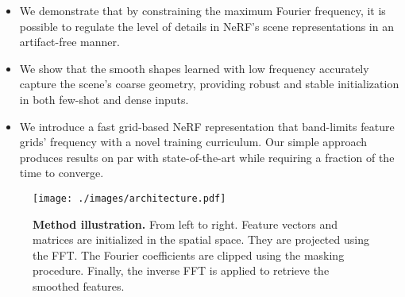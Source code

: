 \begin{itemize}
\item We demonstrate that by constraining the maximum Fourier frequency, it is possible to regulate the level of details in NeRF's scene representations in an artifact-free manner.
\item We show that the smooth shapes learned with low frequency accurately capture the scene's coarse geometry, providing robust and stable initialization in both few-shot and dense inputs.
\item We introduce a fast grid-based NeRF representation that band-limits feature grids’ frequency with a novel training curriculum. Our simple approach produces results on par with state-of-the-art while requiring a fraction of the time to converge.

\end{itemize}

\begin{figure}[t]
	\centering
	\texttt{[image: ./images/architecture.pdf]}
	\caption{\textbf{Method illustration.} From left to right. Feature vectors and matrices are initialized in the spatial space. They are projected using the FFT. The Fourier coefficients are clipped using the masking procedure. Finally, the inverse FFT is applied to retrieve the smoothed features. }
    \vspace{-1em}
	\label{fig:method}
\end{figure}
        
